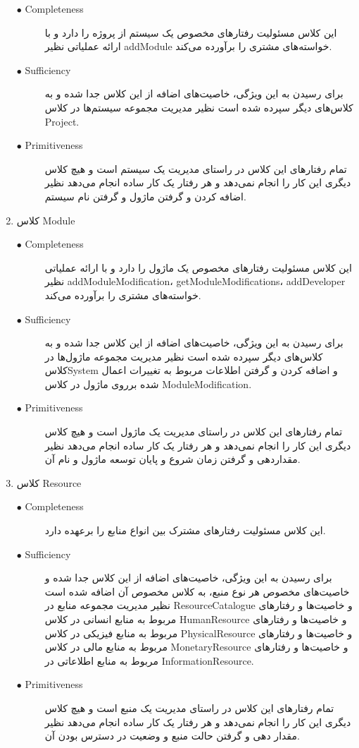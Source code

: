 \begin{enumerate}
\begin{description}
\item[$\bullet$ Completeness]  این کلاس مسئولیت رفتارهای مخصوص یک سیستم از پروژه را دارد و با ارائه عملیاتی نظیر addModule خواسته‌های مشتری را برآورده می‌کند.
\par
\item[$\bullet$ Sufficiency] برای رسیدن به این ویژگی، خاصیت‌های اضافه از این کلاس جدا شده و به کلاس‌های دیگر سپرده شده است نظیر مدیریت مجموعه سیستم‌ها در کلاس Project.
\par
\item[$\bullet$ Primitiveness] تمام رفتارهای این کلاس در راستای مدیریت یک سیستم است و هیچ کلاس دیگری این کار را انجام نمی‌دهد و هر رفتار یک کار ساده انجام می‌دهد نظیر اضافه کردن و گرفتن ماژول و گرفتن نام سیستم. 
\end{description}

\item کلاس Module

\begin{description}
\item[$\bullet$ Completeness]  این کلاس مسئولیت رفتارهای مخصوص یک ماژول را دارد و با ارائه عملیاتی نظیر addModuleModification، getModuleModifications، addDeveloper خواسته‌های مشتری را برآورده می‌کند.
\par
\item[$\bullet$ Sufficiency] برای رسیدن به این ویژگی، خاصیت‌های اضافه از این کلاس جدا شده و به کلاس‌های دیگر سپرده شده است نظیر مدیریت مجموعه ماژول‌ها در کلاسSystem  و اضافه کردن و گرفتن اطلاعات مربوط به تغییرات اعمال شده برروی ماژول در کلاس ModuleModification.
\par
\item[$\bullet$ Primitiveness] تمام رفتارهای این کلاس در راستای مدیریت یک ماژول است و هیچ کلاس دیگری این کار را انجام نمی‌دهد و هر رفتار یک کار ساده انجام می‌دهد نظیر مقداردهی و گرفتن زمان شروع و پایان توسعه ماژول و نام آن. 
\end{description}

\item کلاس Resource

\begin{description}
\item[$\bullet$ Completeness] این کلاس مسئولیت رفتارهای مشترک بین انواع منابع را برعهده دارد.
\par
\item[$\bullet$ Sufficiency] برای رسیدن به این ویژگی، خاصیت‌های اضافه‌ از این کلاس جدا شده و خاصیت‌های مخصوص هر نوع منبع، به کلاس مخصوص آن اضافه شده است نظیر مدیریت مجموعه منابع در ResourceCatalogue و خاصیت‌ها و رفتارهای مربوط به منابع انسانی در کلاس HumanResource و خاصیت‌ها و رفتارهای مربوط به منابع فیزیکی در کلاس PhysicalResource و خاصیت‌ها و رفتارهای مربوط به منابع مالی در کلاس MonetaryResource و خاصیت‌ها و رفتارهای مربوط به منابع اطلاعاتی در InformationResource.
\par
\item[$\bullet$ Primitiveness] تمام رفتارهای این کلاس در راستای مدیریت یک منبع است و هیچ کلاس دیگری این کار را انجام نمی‌دهد و هر رفتار یک کار ساده انجام می‌دهد نظیر مقدار دهی و گرفتن حالت منبع و وضعیت در دسترس بودن آن. 
\end{description}
\end{enumerate}

